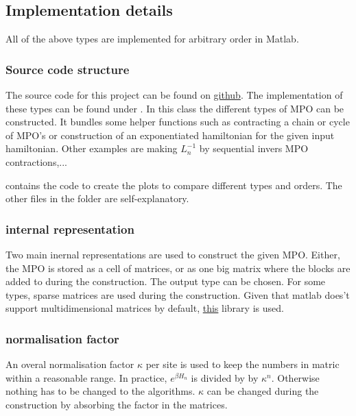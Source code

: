 

\subsection{Implementation details}

All of the above types are implemented for arbitrary order in Matlab.

\subsubsection{Source code structure}

The source code for this project can be found on \href{https://github.com/DavidDevoogdt/Thesis_Tensor_Networks}{github}. The implementation of these types can be found under . In this class the different types of MPO can be constructed. It bundles some helper functions such as contracting a chain or cycle of MPO's or construction of an exponentiated hamiltonian for the given input hamiltonian. Other examples are making $L_n^{-1}$ by sequential invers MPO contractions,...

  contains the code to create the plots to compare different types and orders. The other files in the folder are self-explanatory.

\subsubsection{internal representation}

Two main inernal representations are used to construct the given MPO. Either, the MPO is stored as a cell of matrices, or as one big matrix where the blocks are added to during the construction. The output type can be chosen. For some types, sparse matrices are used during the construction. Given that matlab does't support multidimensional matrices by default, \href{https://nl.mathworks.com/matlabcentral/fileexchange/29832-n-dimensional-sparse-arrays}{this} library is used.

\subsubsection{normalisation factor}

An overal normalisation factor $\kappa$ per site is used to keep the numbers in matric within a reasonable range. In practice, $e^{\beta H_n}$ is divided by by $\kappa^n$. Otherwise nothing has to be changed to the algorithms. $\kappa$ can be changed during the construction by absorbing the factor in the matrices.


